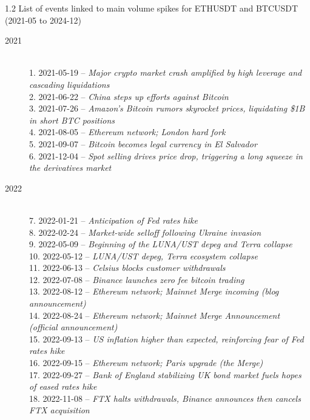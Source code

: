 \documentclass[10pt]{article}
\begin{document}
\begin{setstretch}{1.2}
List of events linked to main volume spikes for ETHUSDT and BTCUSDT (2021-05 to 2024-12)

\begin{description}
    \item[2021] \hfill \\ 1. 2021-05-19 -- \textit{Major crypto market crash amplified by high leverage and cascading liquidations} \\ 2. 2021-06-22 -- \textit{China steps up efforts against Bitcoin} \\ 3. 2021-07-26 -- \textit{Amazon's Bitcoin rumors skyrocket prices, liquidating \$1B in short BTC positions} \\ 4. 2021-08-05 -- \textit{Ethereum network; London hard fork} \\ 5. 2021-09-07 -- \textit{Bitcoin becomes legal currency in El Salvador} \\ 6. 2021-12-04 -- \textit{Spot selling drives price drop, triggering a long squeeze in the derivatives market} 

    \item[2022] \hfill \\ 7. 2022-01-21 -- \textit{Anticipation of Fed rates hike} \\ 8. 2022-02-24 -- \textit{Market-wide selloff following Ukraine invasion} \\ 9. 2022-05-09 -- \textit{Beginning of the LUNA/UST depeg and Terra collapse} \\ 10. 2022-05-12 -- \textit{LUNA/UST depeg, Terra ecosystem collapse} \\ 11. 2022-06-13 -- \textit{Celsius blocks customer withdrawals} \\ 12. 2022-07-08 -- \textit{Binance launches zero fee bitcoin trading} \\ 13. 2022-08-12 -- \textit{Ethereum network; Mainnet Merge incoming (blog announcement)} \\ 14. 2022-08-24 -- \textit{Ethereum network; Mainnet Merge Announcement (official announcement)} \\ 15. 2022-09-13 -- \textit{US inflation higher than expected, reinforcing fear of Fed rates hike} \\ 16. 2022-09-15 -- \textit{Ethereum network; Paris upgrade (the Merge)} \\ 17. 2022-09-27 -- \textit{Bank of England stabilizing UK bond market fuels hopes of eased rates hike} \\ 18. 2022-11-08 -- \textit{FTX halts withdrawals, Binance announces then cancels FTX acquisition} 


\end{description}
\end{setstretch}
\end{document}
